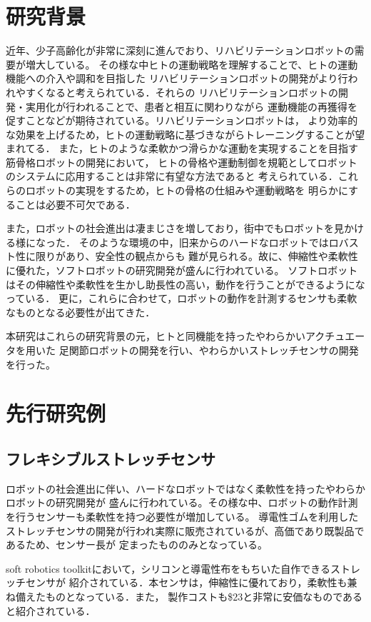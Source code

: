 \section{研究背景}
近年、少子高齢化が非常に深刻に進んでおり、リハビリテーションロボットの需要が増大している。
その様な中ヒトの運動戦略を理解することで、ヒトの運動機能への介入や調和を目指した
リハビリテーションロボットの開発がより行われやすくなると考えられている．それらの
リハビリテーションロボットの開発・実用化が行われることで、患者と相互に関わりながら
運動機能の再獲得を促すことなどが期待されている。リハビリテーションロボットは，
より効率的な効果を上げるため，ヒトの運動戦略に基づきながらトレーニングすることが望まれてる．
また，ヒトのような柔軟かつ滑らかな運動を実現することを目指す筋骨格ロボットの開発において，
ヒトの骨格や運動制御を規範としてロボットのシステムに応用することは非常に有望な方法であると
考えられている．これらのロボットの実現をするため，ヒトの骨格の仕組みや運動戦略を
明らかにすることは必要不可欠である．

また，ロボットの社会進出は凄まじさを増しており，街中でもロボットを見かける様になった．
そのような環境の中，旧来からのハードなロボットではロバスト性に限りがあり、安全性の観点からも
難が見られる。故に、伸縮性や柔軟性に優れた，ソフトロボットの研究開発が盛んに行われている。
ソフトロボットはその伸縮性や柔軟性を生かし助長性の高い，動作を行うことができるようになっている．
更に，これらに合わせて，ロボットの動作を計測するセンサも柔軟なものとなる必要性が出てきた．

本研究はこれらの研究背景の元，ヒトと同機能を持ったやわらかいアクチュエータを用いた
足関節ロボットの開発を行い、やわらかいストレッチセンサの開発を行った。

\section{先行研究例}

\subsection{フレキシブルストレッチセンサ}%
ロボットの社会進出に伴い、ハードなロボットではなく柔軟性を持ったやわらかロボットの研究開発が
盛んに行われている。その様な中、ロボットの動作計測を行うセンサーも柔軟性を持つ必要性が増加している。
導電性ゴムを利用したストレッチセンサの開発が行われ実際に販売されているが、高価であり既製品であるため、センサー長が
定まったもののみとなっている。\cite{bando}

soft robotics toolkit\cite{MITSoftRobot}において，シリコンと導電性布をもちいた自作できるストレッチセンサが
紹介されている．本センサは，伸縮性に優れており，柔軟性も兼ね備えたものとなっている．また，
製作コストも\$23と非常に安価なものであると紹介されている．

